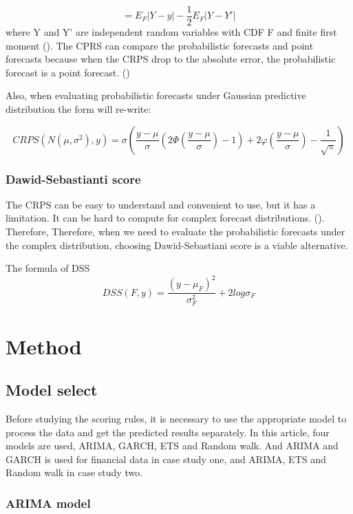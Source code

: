 \documentclass{monashthesis}
\theoremstyle{definition}
\theoremstyle{definition}
\theoremstyle{definition}
\theoremstyle{remark}
\begin{document}
\[
    = E_F|Y-y|-\frac{1}{2}E_F|Y-Y'|
  \] where Y and Y' are independent random variables with CDF F and
finite first moment (\textcite{GR07}). The CPRS can compare the
probabilistic forecasts and point forecasts because when the CRPS drop
to the absolute error, the probabilistic forecast is a point forecast.
(\textcite{GK14})

Also, when evaluating probabilistic forecasts under Gaussian predictive
distribution the form will re-write:

\[
       CRPS(N(\mu,\sigma^2),y)=\sigma\left(\frac{y-\mu}{\sigma}\left(2\Phi\left(\frac{y-\mu}{\sigma}\right)-1\right)+2\varphi\left(\frac{y-\mu}{\sigma}\right)-\frac{1}{\sqrt{\pi}}\right)
  \]

\subsection{Dawid-Sebastianti score}\label{dawid-sebastianti-score}

The CRPS can be easy to understand and convenient to use, but it has a
limitation. It can be hard to compute for complex forecast
distributions. (\textcite{GK14}). Therefore, Therefore, when we need to
evaluate the probabilistic forecasts under the complex distribution,
choosing Dawid-Sebastiani score is a viable alternative.

The formula of DSS \[
     DSS(F,y)=\frac{(y-\mu_F)^2}{\sigma_F^2}+2log\sigma_F
  \]

\chapter{Method}\label{method}

\section{Model select}\label{model-select}

Before studying the scoring rules, it is necessary to use the
appropriate model to process the data and get the predicted results
separately. In this article, four models are used, ARIMA, GARCH, ETS and
Random walk. And ARIMA and GARCH is used for financial data in case
study one, and ARIMA, ETS and Random walk in case study two.

\subsection{ARIMA model}\label{arima-model}
\end{document}
